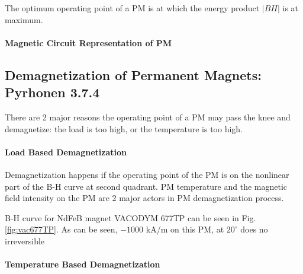 The optimum operating point of a PM is at which the energy product $|BH|$ is at maximum. 


\paragraph{Magnetic Circuit Representation of PM}



\subsection{Demagnetization of Permanent Magnets: Pyrhonen 3.7.4}

There are 2 major reasons the operating point of a PM may pass the knee and demagnetize: the load is too high, or the temperature is too high.

\paragraph{Load Based Demagnetization}
Demagnetization happens if the operating point of the PM is on the nonlinear part of the B-H curve at second quadrant. PM temperature and the magnetic field intensity on the PM are 2 major actors in PM demagnetization process.




B-H curve for NdFeB magnet VACODYM 677TP can be seen in Fig. \ref{fig:vac677TP}. As can be seen, $-1000$ kA/m on this PM, at $20^{\circ}$ does no irreversible 

\paragraph{Temperature Based Demagnetization}





